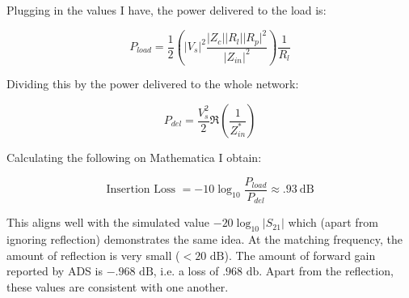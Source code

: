 Plugging in the values I have, the power delivered to the load is:

\[ 
        P_{load} = \frac{1}{2}\left( |V_s|^2 \frac{\Big| Z_{c}||R_l||R_p \Big|^2
                }{\Big| Z_{in} \Big|^2} \right) \frac{1}{R_l} 
\]

Dividing this by the power delivered to the whole network:

\[ 
        P_{del} = \frac{V_s^2}{2} \Re \left( \frac{1}{Z_{in}^*} \right)
\]

Calculating the following on Mathematica I obtain:

\[ 
        \text{Insertion Loss~} =-10 \log_{10} \frac{P_{load}}{P_{del}} \approx .93~\text{dB}
\]

This aligns well with the simulated value $-20 \log_{10}\left| S_{21} \right|$
which (apart from ignoring reflection) demonstrates the same idea. At the matching
frequency, the amount of reflection is very small ($< 20 \text{~dB}$). The
amount of forward gain reported by ADS is $-.968 \text{~dB}$, i.e. a loss of
$.968 \text{~db}$. Apart from the reflection, these values are consistent with
one another.
